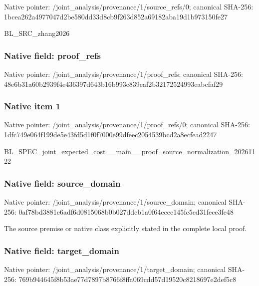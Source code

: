 \documentclass[10pt,a4paper]{article}
\begin{document}
Native pointer: /joint\_analysis/provenan\allowbreak{}ce/1/source\_refs/0; canonical SHA-256: 1bcea262a4977047d2be580d\allowbreak{}d33d8cb9f263d852a69182ab\allowbreak{}a19d1b973150fe27


BL\_SRC\_zhang2026


\subsubsection{Native field: proof\_refs}


Native pointer: /joint\_analysis/provenance/1/proof\_refs; canonical SHA-256: 48e6b31a60b2939f4e436397\allowbreak{}d643b16b993c839eaf2b3217\allowbreak{}2524993eabcfaf29



\subsubsection{Native item 1}


Native pointer: /joint\_analysis/provenan\allowbreak{}ce/1/proof\_refs/0; canonical SHA-256: 1dfc749e064f199de5e43fd5\allowbreak{}d1f0f7000e99dfeec2054539\allowbreak{}bcd2a8ecfead2247


BL\_SPEC\_joint\_expected\_c\allowbreak{}ost\_\_main\_\_proof\_source\_\allowbreak{}normalization\_20261122


\subsubsection{Native field: source\_domain}


Native pointer: /joint\_analysis/provenan\allowbreak{}ce/1/source\_domain; canonical SHA-256: 0af78bd3881e6adf6d081506\allowbreak{}8b0b027ddcb1a0f64ecee145\allowbreak{}fc5cd31fece3fe48


The source premise or native class explicitly stated in the complete local proof.


\subsubsection{Native field: target\_domain}


Native pointer: /joint\_analysis/provenan\allowbreak{}ce/1/target\_domain; canonical SHA-256: 769b944645f8b53ae77d7897\allowbreak{}b8766f8ffa069cdd57d19520\allowbreak{}c8218697e2def5c8
\end{document}
